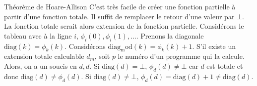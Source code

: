 \begin{mcqs}
  {Théorème de Hoare-Allison}
  {C'est très facile de créer une fonction partielle à partir d'une fonction totale.
  Il suffit de remplacer le retour d'une valeur par $\bot$. La fonction totale serait alors extension de la fonction partielle.}
  {Considérons le tableau avec à la ligne $i$, $\phi_i(0), \phi_i(1), \ldots$.
  Prenons la diagonale $\mathrm{diag}(k) = \phi_k(k)$.
  Considérons $\mathrm{diag_mod}(k) = \phi_k(k)+1$.
  S'il existe un extension totale calculable $d_m$, soit $p$ le numéro d'un programme qui la calcule.
  Alors, on a un soucis en $d,d$.
  Si $\mathrm{diag}(d) = \bot$, $\phi_d(d) \neq \bot$ car $d$ est totale et donc $\mathrm{diag}(d) \neq \phi_d(d)$.
  Si $\mathrm{diag}(d) \neq \bot$, $\phi_d(d) = \mathrm{diag}(d) + 1 \neq \mathrm{diag}(d)$.}
\end{mcqs}
